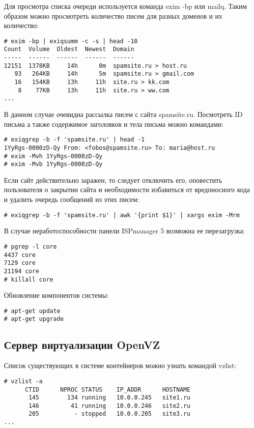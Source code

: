 Для просмотра списка очереди используется команда exim -bp или mailq.
Таким образом можно просмотреть количество писем для разных доменов и их количество:
\begin{lstlisting}
# exim -bp | exiqsumm -c -s | head -10
Count  Volume  Oldest  Newest  Domain
-----  ------  ------  ------  ------
12151  1378KB     14h      0m  spamsite.ru > host.ru
   93   264KB     14h      5m  spamsite.ru > gmail.com
   16   154KB     13h     11h  site.ru > kk.com
    8    77KB     13h     11h  site.ru > ww.com
...
\end{lstlisting}

В данном случае очевидна рассылка писем с сайта spamsite.ru.
Посмотреть ID письма а также содержимое заголовков и тела письма можно командами:
\begin{lstlisting}
# exiqgrep -b -f 'spamsite.ru' | head -1
1YyRgs-0000zD-Qy From: <fobos@spamsite.ru> To: maria@host.ru
# exim -Mvh 1YyRgs-0000zD-Qy
# exim -Mvb 1YyRgs-0000zD-Qy
\end{lstlisting}

Если сайт действительно заражен, то следует отключить его, оповестить пользователя о закрытии сайта и необходимости избавиться от вредоносного кода и удалить очередь сообщений из этих писем:
\begin{lstlisting}
# exiqgrep -b -f 'spamsite.ru' | awk '{print $1}' | xargs exim -Mrm
\end{lstlisting}

В случае неработоспособности панели ISPmanager 5 возможна ее перезагрузка:
\begin{lstlisting}
# pgrep -l core
4437 core
7129 core
21194 core
# killall core
\end{lstlisting}

Обновление компонентов системы:
\begin{lstlisting}
# apt-get update
# apt-get upgrade
\end{lstlisting}

\subsection{Сервер виртуализации OpenVZ}

Список существующих в системе контейнеров можно узнать командой vzlist:
\begin{lstlisting}
# vzlist -a
      CTID      NPROC STATUS    IP_ADDR      HOSTNAME
       145        134 running   10.0.0.245   site1.ru
       146         41 running   10.0.0.246   site2.ru
       205          - stopped   10.0.0.205   site3.ru
...
\end{lstlisting}

